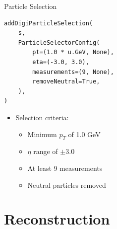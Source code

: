 \documentclass[lualatex,aspectratio=169,t,13pt,dvipsnames]{beamer}
\begin{document}
\begin{frame}[fragile,c]{Particle Selection}
  \begin{verbatim}
addDigiParticleSelection(
    s,
    ParticleSelectorConfig(
        pt=(1.0 * u.GeV, None),
        eta=(-3.0, 3.0),
        measurements=(9, None),
        removeNeutral=True,
    ),
)
  \end{verbatim}
  
  \begin{itemize}
    \item Selection criteria:
    \begin{itemize}
      \item Minimum $p_T$ of 1.0 GeV
      \item $\eta$ range of $\pm$3.0
      \item At least 9 measurements
      \item Neutral particles removed
    \end{itemize}
  \end{itemize}
\end{frame}

\section{Reconstruction}
\end{document}
